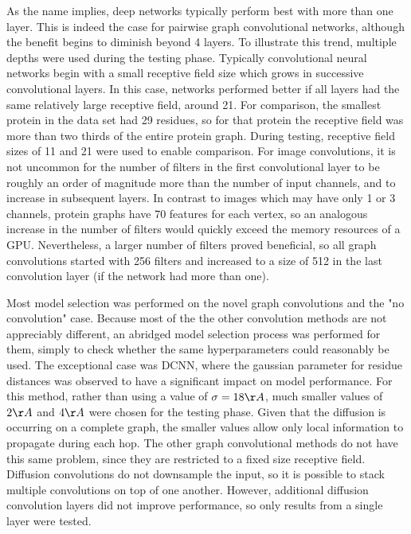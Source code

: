 As the name implies, deep networks typically perform best with more than one layer. 
This is indeed the case for pairwise graph convolutional networks, although the benefit begins to diminish beyond 4 layers.
To illustrate this trend, multiple depths were used during the testing phase.
Typically convolutional neural networks begin with a small receptive field size which grows in successive convolutional layers.
In this case, networks performed better if all layers had the same relatively large receptive field, around 21. 
For comparison, the smallest protein in the data set had 29 residues, so for that protein the receptive field was more than two thirds of the entire protein graph. 
During testing, receptive field sizes of 11 and 21 were used to enable comparison.
For image convolutions, it is not uncommon for the number of filters in the first convolutional layer to be roughly an order of magnitude more than the number of input channels, and to increase in subsequent layers.
In contrast to images which may have only 1 or 3 channels, protein graphs have 70 features for each vertex, so an analogous increase in the number of filters would quickly exceed the memory resources of a GPU.
Nevertheless, a larger number of filters proved beneficial, so all graph convolutions started with 256 filters and increased to a size of 512 in the last convolution layer (if the network had more than one).


Most model selection was performed on the novel graph convolutions and the "no convolution" case.
Because most of the the other convolution methods are not appreciably different, an abridged model selection process was performed for them, simply to check whether the same hyperparameters could reasonably be used. 
The exceptional case was DCNN, where the gaussian parameter for residue distances was observed to have a significant impact on model performance. 
For this method, rather than using a value of $\sigma = 18\AA{}$, much smaller values of $2\AA{}$ and $4\AA{}$ were chosen for the testing phase.
Given that the diffusion is occurring on a complete graph, the smaller values allow only local information to propagate during each hop.
The other graph convolutional methods do not have this same problem, since they are restricted to a fixed size receptive field. 
Diffusion convolutions do not downsample the input, so it is possible to stack multiple convolutions on top of one another.
However, additional diffusion convolution layers did not improve performance, so only results from a single layer were tested.

